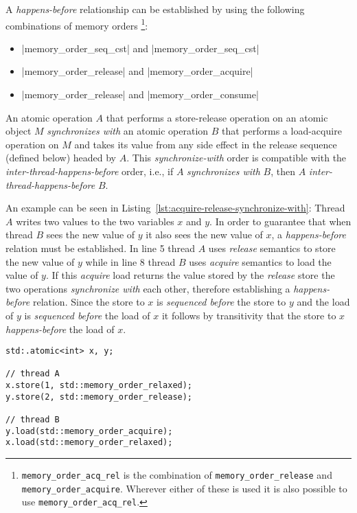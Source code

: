 \documentclass[a4paper,12pt,notitlepage,twoside,openright]{article}
\begin{document}
A \emph{happens-before} relationship can be established by using the
following combinations of memory orders
\footnote{\lstinline|memory_order_acq_rel| is the combination of
  \lstinline|memory_order_release| and
  \lstinline|memory_order_acquire|. Wherever either of these is used it
  is also possible to use \lstinline|memory_order_acq_rel|.}:
\begin{itemize}
	\item |memory_order_seq_cst| and |memory_order_seq_cst|
	\item |memory_order_release| and |memory_order_acquire|
	\item |memory_order_release| and |memory_order_consume|
\end{itemize}

An atomic operation $A$ that performs a store-release operation on an
atomic object $M$ \emph{synchronizes with} an atomic operation $B$
that performs a load-acquire operation on $M$ and takes its value from
any side effect in the release sequence (defined below) headed by $A$.
This \emph{synchronize-with} order is compatible with the
\emph{inter-thread-happens-before} order, i.e., if $A$
\emph{synchronizes with} $B$, then $A$ \emph{inter-thread-happens-before}
$B$.

An example can be seen in
Listing~\ref{lst:acquire-release-synchronize-with}: Thread $A$ writes
two values to the two variables $x$ and $y$. In order to guarantee
that when thread $B$ sees the new value of $y$ it also sees the new
value of $x$, a \emph{happens-before} relation must be established. In
line 5 thread $A$ uses \emph{release} semantics to store the new value
of $y$ while in line 8 thread $B$ uses \emph{acquire} semantics to
load the value of $y$. If this \emph{acquire} load returns the value
stored by the \emph{release} store the two operations
\emph{synchronize with} each other, therefore establishing a
\emph{happens-before} relation. Since the store to $x$ is
\emph{sequenced before} the store to $y$ and the load of $y$ is
\emph{sequenced before} the load of $x$ it follows by transitivity
that the store to $x$ \emph{happens-before} the load of $x$.

\begin{lstlisting}[caption={Example of \emph{synchronize-with} relation with release/acquire operations.}, label=lst:acquire-release-synchronize-with]
std:.atomic<int> x, y;

// thread A
x.store(1, std::memory_order_relaxed);
y.store(2, std::memory_order_release);

// thread B
y.load(std::memory_order_acquire);
x.load(std::memory_order_relaxed);
\end{lstlisting}
\end{document}

